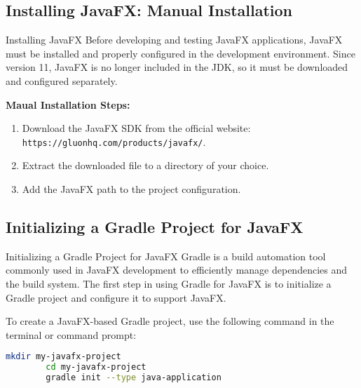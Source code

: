 \documentclass[aspectratio=169, table]{beamer}
\begin{document}
\subsection{Installing JavaFX: Manual Installation}

\begin{frame}{Installing JavaFX}
	\vspace{20pt}
	Before developing and testing JavaFX applications, JavaFX must be installed and properly configured in the development environment.
	Since version 11, JavaFX is no longer included in the JDK, so it must be downloaded and configured separately.
	
	\textbf{Maual Installation Steps:}
	\begin{enumerate}
		\item Download the JavaFX SDK from the official website:  
		\texttt{https://gluonhq.com/products/javafx/}.
		\item Extract the downloaded file to a directory of your choice.
		\item Add the JavaFX path to the project configuration.
	\end{enumerate}
\end{frame}



\subsection{Initializing a Gradle Project for JavaFX}
\label{gradle_javafx}

\begin{frame}[fragile]{Initializing a Gradle Project for JavaFX}
	\vspace{20pt}
	Gradle is a build automation tool commonly used in JavaFX development to efficiently manage dependencies and the build system.  
	The first step in using Gradle for JavaFX is to initialize a Gradle project and configure it to support JavaFX.
	
	To create a JavaFX-based Gradle project, use the following command in the terminal or command prompt:
	
	\begin{lstlisting}[language=bash, caption=Initializing a Gradle Project]
		mkdir my-javafx-project
		cd my-javafx-project
		gradle init --type java-application
	\end{lstlisting}
\end{frame}
\end{document}
